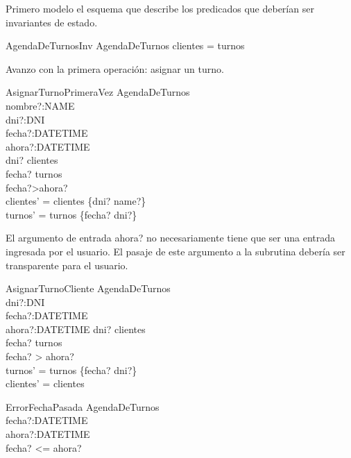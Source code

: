 \documentclass[%
  fleqn,colorlinks,linkcolor=blue,citecolor=blue,urlcolor=blue]{eptcs}
\DeclareMathOperator{\Ima}{Im}
\begin{document}
  Primero modelo el esquema que describe los predicados que deber\'i{}an ser invariantes de estado.

  \begin{schema}{AgendaDeTurnosInv}
  AgendaDeTurnos
  \where
  \dom clientes = \Ima turnos
  \end{schema}

  Avanzo con la primera operaci\'on: asignar un turno.

  \begin{schema}{AsignarTurnoPrimeraVez}
  \Delta AgendaDeTurnos \\
  nombre?:NAME \\
  dni?:DNI \\
  fecha?:DATETIME \\
  ahora?:DATETIME \\
  \where
  dni? \notin \dom clientes \\
  fecha? \notin \dom turnos \\
  fecha?>ahora? \\
  clientes' = clientes \cup \{dni? \mapsto name?\} \\
  turnos' = turnos \cup \{fecha? \mapsto dni?\} \\
  \end{schema}

  El argumento de entrada ahora? no necesariamente tiene que ser una entrada ingresada por el usuario.
  El pasaje de este argumento a la subrutina deber\'i{}a ser transparente para el usuario.

  \begin{schema}{AsignarTurnoCliente}
  \Delta AgendaDeTurnos \\
  dni?:DNI \\
  fecha?:DATETIME \\
  ahora?:DATETIME
  \where
  dni? \in \dom clientes \\
  fecha? \notin \dom turnos \\
  fecha? > ahora? \\
  turnos' = turnos \cup \{fecha? \mapsto dni?\} \\
  clientes' = clientes \\
  \end{schema}

  \begin{schema}{ErrorFechaPasada}
  \Xi AgendaDeTurnos \\
  fecha?:DATETIME \\
  ahora?:DATETIME \\
  \where
  fecha? <= ahora? \\
  \end{schema}
\end{document}
